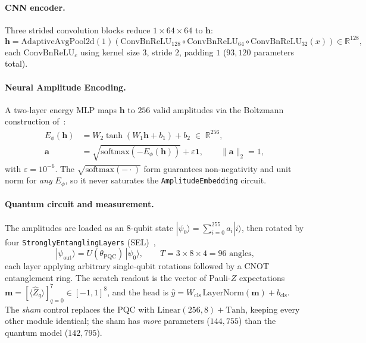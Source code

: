 \documentclass[10pt,letterpaper]{article}
\theoremstyle{plain}
\theoremstyle{definition}
\begin{document}
\paragraph{CNN encoder.}
Three strided convolution blocks reduce $1\times64\times64$ to $\mathbf{h}$:
\begin{equation}
  \mathbf{h}
  = \mathrm{AdaptiveAvgPool2d}(1)\!\left(
      \mathrm{ConvBnReLU}_{128} \circ
      \mathrm{ConvBnReLU}_{64}  \circ
      \mathrm{ConvBnReLU}_{32}(x)
    \right) \in \mathbb{R}^{128},
\end{equation}
each $\mathrm{ConvBnReLU}_c$ using kernel size $3$, stride $2$, padding $1$
($93{,}120$ parameters total).

\paragraph{Neural Amplitude Encoding.}
A two-layer energy MLP maps $\mathbf{h}$ to $256$ valid amplitudes via the
Boltzmann construction of~\cite{wang2025}:
\begin{align}
  E_\phi(\mathbf{h}) &= W_2 \tanh(W_1 \mathbf{h} + b_1) + b_2 \;\in\; \mathbb{R}^{256}, \label{eq:energy}\\
  \mathbf{a}         &= \sqrt{\mathrm{softmax}(-E_\phi(\mathbf{h}))} + \varepsilon\mathbf{1},
                       \qquad \|\mathbf{a}\|_2 = 1, \label{eq:nae}
\end{align}
with $\varepsilon = 10^{-6}$. The $\sqrt{\mathrm{softmax}(-\cdot)}$ form guarantees
non-negativity and unit norm for \emph{any} $E_\phi$, so it never saturates the
\texttt{AmplitudeEmbedding} circuit.

\paragraph{Quantum circuit and measurement.}
The amplitudes are loaded as an 8-qubit state
$|\psi_0\rangle = \sum_{i=0}^{255} a_i |i\rangle$, then rotated by four
\texttt{StronglyEntanglingLayers} (SEL)~\cite{pennylane},
\begin{equation}
  |\psi_\mathrm{out}\rangle = U(\theta_\mathrm{PQC})\,|\psi_0\rangle,
  \qquad T = 3 \times 8 \times 4 = 96 \text{ angles,}
\end{equation}
each layer applying arbitrary single-qubit rotations followed by a CNOT
entanglement ring. The scratch readout is the vector of Pauli-$Z$ expectations
$\mathbf{m} = [\langle \hat{Z}_q\rangle]_{q=0}^{7} \in [-1,1]^{8}$, and the head is
$\hat{y} = W_\mathrm{cls}\,\mathrm{LayerNorm}(\mathbf{m}) + b_\mathrm{cls}$.
The \emph{sham} control replaces the PQC with $\mathrm{Linear}(256,8)+\mathrm{Tanh}$,
keeping every other module identical; the sham has \emph{more} parameters
($144{,}755$) than the quantum model ($142{,}795$).
\end{document}
